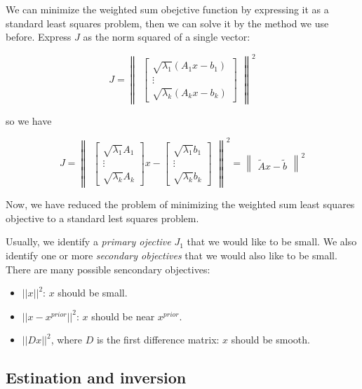 \documentclass[11pt]{article}
\providecommand{\tightlist}{%
      \setlength{\itemsep}{0pt}\setlength{\parskip}{0pt}}
\begin{document}
We can minimize the weighted sum obejctive function by expressing it as
a standard least squares problem, then we can solve it by the method we
use before. Express \(J\) as the norm squared of a single vector:

\[ J = \begin{Vmatrix}
\begin{bmatrix}
\sqrt{\lambda_{1}}(A_{1}x - b_{1}) \\
\vdots \\
\sqrt{\lambda_{k}}(A_{k}x - b_{k})
\end{bmatrix}
\end{Vmatrix}^{2}\]

so we have

\[
J = \begin{Vmatrix}
\begin{bmatrix}\sqrt{\lambda_{1}}A_{1}\\ \vdots \\ \sqrt{\lambda_{k}}A_{k} \end{bmatrix}x -
\begin{bmatrix}\sqrt{\lambda_{1}}b_{1}\\ \vdots \\ \sqrt{\lambda_{k}}b_{k} \end{bmatrix}
\end{Vmatrix}^{2}
=
\begin{Vmatrix}\tilde{A}x - \tilde{b} \end{Vmatrix}^{2}
\]

Now, we have reduced the problem of minimizing the weighted sum least
squares objective to a standard lest squares problem.

Usually, we identify a \emph{primary ojective} \(J_{1}\) that we would
like to be small. We also identify one or more \emph{secondary
objectives} that we would also like to be small. There are many possible
sencondary objectives:

\begin{itemize}
\tightlist
\item
  \(||x||^{2}\): \(x\) should be small.
\item
  \(|| x - x^{prior}||^{2}\): \(x\) should be near \(x^{prior}\).
\item
  \(||Dx||^{2}\), where \(D\) is the first difference matrix: \(x\)
  should be smooth.
\end{itemize}

\subsection{Estination and inversion}\label{estination-and-inversion}
\end{document}
